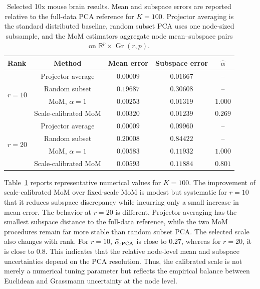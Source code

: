 \documentclass[11pt]{article}
\newcommand{\R}{\mathbb R}
\newcommand{\Gr}{\operatorname{Gr}}
\begin{document}
\begin{table}[tb]
\centering
\caption{
{Selected 10x mouse brain results.}
Mean and subspace errors are reported relative to the full-data PCA reference for \(K=100\).  Projector averaging is the standard distributed baseline, random subset PCA uses one node-sized subsample, and the MoM estimators aggregate node mean--subspace pairs on \(\R^p\times\Gr(r,p)\).  
}
\label{tab:real-mouse-selected}
\begin{tabular}{lcccc}
\toprule\noalign{}
Rank & Method & Mean error & Subspace error & \(\widehat\alpha\) \\
\midrule
\multirow{4}{*}{\(r=10\)}
& Projector average & \(0.00009\) & \(0.01667\) & -- \\
& Random subset & \(0.19687\) & \(0.30608\) & -- \\
& MoM, \(\alpha=1\) & \(0.00253\) & \(0.01319\) & \(1.000\) \\
& Scale-calibrated MoM & \(0.00320\) & \(0.01239\) & \(0.269\) \\
\midrule
\multirow{4}{*}{\(r=20\)}
& Projector average & \(0.00009\) & \(0.09960\) & -- \\
& Random subset & \(0.20008\) & \(0.84422\) & -- \\
& MoM, \(\alpha=1\) & \(0.00583\) & \(0.11932\) & \(1.000\) \\
& Scale-calibrated MoM & \(0.00593\) & \(0.11884\) & \(0.801\) \\
\bottomrule
\end{tabular}
\end{table}


Table~\ref{tab:real-mouse-selected} reports representative numerical values for \(K=100\).  The improvement of scale-calibrated MoM over fixed-scale MoM is modest but systematic for \(r=10\) that it reduces subspace discrepancy while incurring only a small increase in mean error. The behavior at \(r=20\) is different.  Projector averaging has the smallest subspace distance to the full-data reference, while the two MoM procedures remain far more stable than random subset PCA.  The selected scale also changes with rank.  For \(r=10\), \(\widehat\alpha_{\rm rPCA}\) is close to \(0.27\), whereas for \(r=20\), it is close to \(0.8\).  This indicates that the relative node-level mean and subspace uncertainties depend on the PCA resolution.  Thus, the calibrated scale is not merely a numerical tuning parameter but reflects the empirical balance between Euclidean and Grassmann uncertainty at the node level.
\end{document}
